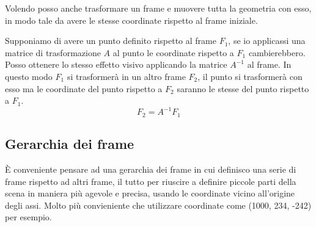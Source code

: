 Volendo posso anche trasformare un frame e muovere tutta la geometria con esso, in modo tale
da avere le stesse coordinate rispetto al frame iniziale.

Supponiamo di avere un punto definito rispetto al frame $F_1$, se io applicassi una matrice
di trasformazione $A$ al punto le coordinate rispetto a $F_1$ cambierebbero. Posso ottenere
lo stesso effetto visivo applicando la matrice $A^{-1}$ al frame. In questo modo $F_1$
si trasformer\`a in un altro frame $F_2$, il punto si trasformer\`a con esso ma le
coordinate del punto rispetto a $F_2$ saranno le stesse del punto rispetto a $F_1$.
\[ F_2 = A^{-1} F_1 \]

\subsection{Gerarchia dei frame}
\`E conveniente pensare ad una gerarchia dei frame in cui definisco una serie di frame
rispetto ad altri frame, il tutto per riuscire a definire piccole parti della scena
in maniera pi\`u agevole e precisa, usando le coordinate vicino all'origine degli assi.
Molto pi\`u convieniente che utilizzare coordinate come (1000, 234, -242) per esempio.